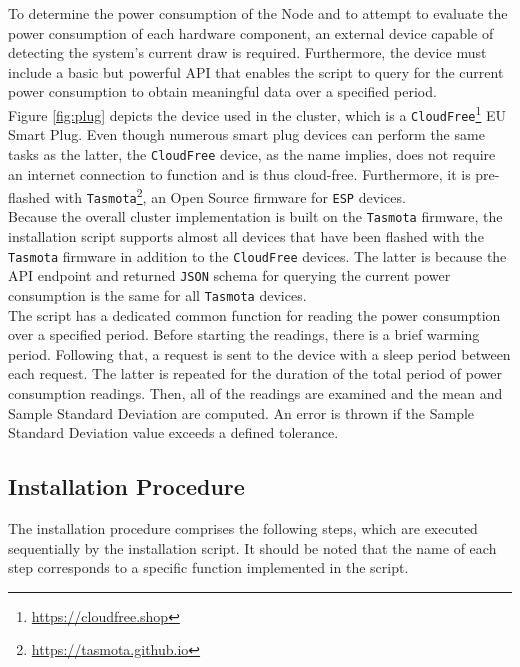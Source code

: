To determine the power consumption of the Node and to attempt to evaluate the
power consumption of each hardware component, an external device capable of detecting
the system's current draw is required. Furthermore, the device must include a basic
but powerful API that enables the script to query for the current power consumption
to obtain meaningful data over a specified period. \\ %
Figure \ref{fig:plug} depicts the device used in the cluster, which is a \texttt{CloudFree}\footnote{\url{https://cloudfree.shop}}
EU Smart Plug. Even though numerous smart plug devices can perform the same
tasks as the latter, the \texttt{CloudFree} device, as the name implies, does
not require an internet connection to function and is thus cloud-free. Furthermore,
it is pre-flashed with \texttt{Tasmota}\footnote{\url{https://tasmota.github.io}},
an Open Source firmware for \texttt{ESP} devices. \\ %
Because the overall cluster implementation is built on the \texttt{Tasmota}
firmware, the installation script supports almost all devices that have been flashed
with the \texttt{Tasmota} firmware in addition to the \texttt{CloudFree} devices.
The latter is because the API endpoint and returned \texttt{JSON} schema for querying
the current power consumption is the same for all \texttt{Tasmota} devices. \\ %
The script has a dedicated common function for reading the power consumption
over a specified period. Before starting the readings, there is a brief warming
period. Following that, a request is sent to the device with a sleep period
between each request. The latter is repeated for the duration of the total period
of power consumption readings. Then, all of the readings are examined and the mean
and Sample Standard Deviation are computed. An error is thrown if the Sample
Standard Deviation value exceeds a defined tolerance.

\subsection{Installation Procedure}
\label{subsec:implementation_installer_installation_procedure}

The installation procedure comprises the following steps, which are executed
sequentially by the installation script. It should be noted that the name of each
step corresponds to a specific function implemented in the script.

